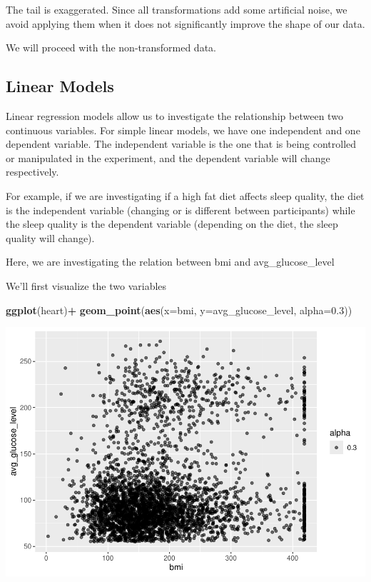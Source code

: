 \documentclass[
]{book}
\newenvironment{Shaded}{\begin{snugshade}}{\end{snugshade}}
\newcommand{\AttributeTok}[1]{\textcolor[rgb]{0.13,0.29,0.53}{#1}}
\newcommand{\FloatTok}[1]{\textcolor[rgb]{0.00,0.00,0.81}{#1}}
\newcommand{\FunctionTok}[1]{\textcolor[rgb]{0.13,0.29,0.53}{\textbf{#1}}}
\newcommand{\NormalTok}[1]{#1}
\newcommand{\SpecialCharTok}[1]{\textcolor[rgb]{0.81,0.36,0.00}{\textbf{#1}}}
\begin{document}
The tail is exaggerated. Since all transformations add some artificial noise, we avoid applying them when it does not significantly improve the shape of our data.

We will proceed with the non-transformed data.

\subsection{Linear Models}\label{linear-models}

Linear regression models allow us to investigate the relationship between two continuous variables. For simple linear models, we have one independent and one dependent variable. The independent variable is the one that is being controlled or manipulated in the experiment, and the dependent variable will change respectively.

For example, if we are investigating if a high fat diet affects sleep quality, the diet is the independent variable (changing or is different between participants) while the sleep quality is the dependent variable (depending on the diet, the sleep quality will change).

Here, we are investigating the relation between bmi and avg\_glucose\_level

We'll first visualize the two variables

\begin{Shaded}
\begin{Highlighting}[]
\FunctionTok{ggplot}\NormalTok{(heart)}\SpecialCharTok{+}
  \FunctionTok{geom\_point}\NormalTok{(}\FunctionTok{aes}\NormalTok{(}\AttributeTok{x=}\NormalTok{bmi, }\AttributeTok{y=}\NormalTok{avg\_glucose\_level, }\AttributeTok{alpha=}\FloatTok{0.3}\NormalTok{))}
\end{Highlighting}
\end{Shaded}

\includegraphics{_main_files/figure-latex/unnamed-chunk-98-1.pdf}
\end{document}

